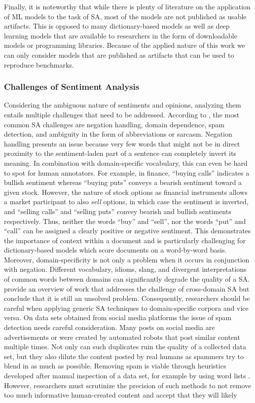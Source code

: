 Finally, it is noteworthy that while there is plenty of literature on the application of ML models to the task of SA, most of the models are not published as usable artifacts. This is opposed to many dictionary-based models as well as deep learning models that are available to researchers in the form of downloadable models or programming libraries. Because of the applied nature of this work we can only consider models that are published as artifacts that can be used to reproduce benchmarks.


\subsubsection{Challenges of Sentiment Analysis}
\label{section-sa-challenges}
Considering the ambiguous nature of sentiments and opinions, analyzing them entails multiple challenges that need to be addressed. According to , the most common SA challenges are negation handling, domain dependence, spam detection, and ambiguity in the form of abbreviations or sarcasm. Negation handling presents an issue because very few words that might not be in direct proximity to the sentiment-laden part of a sentence can completely invert its meaning. In combination with domain-specific vocabulary, this can even be hard to spot for human annotators. For example, in finance, ``buying calls'' indicates a bullish sentiment whereas ``buying puts'' conveys a bearish sentiment toward a given stock. However, the nature of stock options as financial instruments allows a market participant to also \emph{sell} options, in which case the sentiment is inverted, and ``selling calls'' and ``selling puts'' convey bearish and bullish sentiments respectively. Thus, neither the words ``buy'' and ``sell'', nor the words ``put'' and ``call'' can be assigned a clearly positive or negative sentiment. This demonstrates the importance of context within a document and is particularly challenging for dictionary-based models which score documents on a word-by-word basis. Moreover, domain-specificity is not only a problem when it occurs in conjunction with negation. Different vocabulary, idioms, slang, and divergent interpretations of common words between domains can significantly degrade the quality of a SA.  provide an overview of work that addresses the challenge of cross-domain SA but conclude that it is still an unsolved problem. Consequently, researchers should be careful when applying generic SA techniques to domain-specific corpora and vice versa. On data sets obtained from social media platforms the issue of spam detection needs careful consideration. Many posts on social media are advertisements or were created by automated robots that post similar content multiple times. Not only can such duplicates ruin the quality of a collected data set, but they also dilute the content posted by real humans as spammers try to blend in as much as possible. Removing spam is viable through heuristics developed after manual inspection of a data set, for example by using word lists . However, researchers must scrutinize the precision of such methods to not remove too much informative human-created content and accept that they will likely 